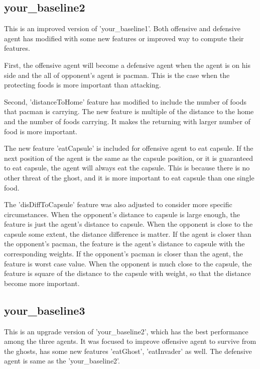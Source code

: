 \documentclass{article}
\theoremstyle{plain}
\theoremstyle{definition}
\theoremstyle{remark}
\begin{document}
\subsection{your\_baseline2}

This is an improved version of 'your\_baseline1'. Both offensive and defensive agent has modified with some new features or improved way to compute their features.

First, the offensive agent will become a defensive agent when the agent is on his side and the all of opponent's agent is pacman. This is the case when the protecting foods is more important than attacking.

Second, 'distanceToHome' feature has modified to include the number of foods that pacman is carrying. The new feature is multiple of the distance to the home and the number of foods carrying. It makes the returning with larger number of food is more important.

The new feature 'eatCapsule' is included for offensive agent to eat capsule. If the next position of the agent is the same as the capsule position, or it is guaranteed to eat capsule, the agent will always eat the capsule. This is because there is no other threat of the ghost, and it is more important to eat capsule than one single food.

The 'disDiffToCapsule' feature was also adjusted to consider more specific circumstances. When the opponent's distance to capsule is large enough, the feature is just the agent's distance to capsule. When the opponent is close to the capsule some extent, the distance difference is matter. If the agent is closer than the opponent's pacman, the feature is the agent's distance to capsule with the corresponding weights. If the opponent's pacman is closer than the agent, the feature is worst case value. When the opponent is much close to the capsule, the feature is square of the distance to the capsule with weight, so that the distance become more important.



\subsection{your\_baseline3}

This is an upgrade version of 'your\_baseline2', which has the best performance among the three agents. It was focused to improve offensive agent to survive from the ghosts, has some new features 'eatGhost', 'eatInvader' as well. The defensive agent is same as the 'your\_baseline2'.
\end{document}
